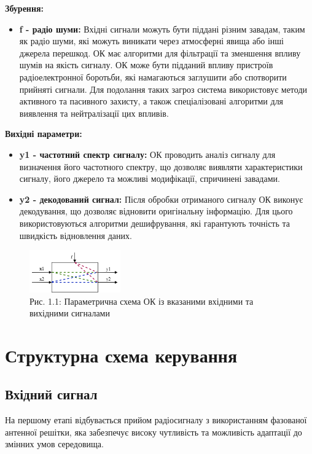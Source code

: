 \documentclass[a4paper]{article}
\begin{document}
\textbf{Збурення:}

\begin{itemize}
    \item \textbf{f - радіо шуми:} Вхідні сигнали можуть бути піддані різним завадам, таким як радіо шуми, які можуть виникати через атмосферні явища або інші джерела перешкод. ОК має алгоритми для фільтрації та зменшення впливу шумів на якість сигналу.
    ОК може бути підданий впливу пристроїв радіоелектронної боротьби, які намагаються заглушити або спотворити прийняті сигнали. Для подолання таких загроз система використовує методи активного та пасивного захисту, а також спеціалізовані алгоритми для виявлення та нейтралізації цих впливів.
\end{itemize}

\textbf{Вихідні параметри:}

\begin{itemize}
    \item \textbf{y1 - частотний спектр сигналу:} ОК проводить аналіз сигналу для визначення його частотного спектру, що дозволяє виявляти характеристики сигналу, його джерело та можливі модифікації, спричинені завадами.
    \item \textbf{y2 - декодований сигнал:} Після обробки отриманого сигналу ОК виконує декодування, що дозволяє відновити оригінальну інформацію. Для цього використовуються алгоритми дешифрування, які гарантують точність та швидкість відновлення даних. 
\end{itemize}
\begin{figure}[h]
    \centering
    \includegraphics[width=0.35\textwidth]{imgs/PW1.1.drawio.png}
    \caption*{Рис. 1.1: Параметрична схема ОК із вказаними вхідними та вихідними сигналами}
\end{figure} 


\section*{Структурна схема керування}

\subsection*{Вхідний сигнал}  
На першому етапі відбувається прийом радіосигналу з використанням фазованої антенної решітки, яка забезпечує високу чутливість та можливість адаптації до змінних умов середовища.  
\end{document}
